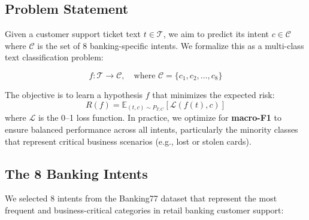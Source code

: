 \documentclass[12pt,a4paper]{article}
\begin{document}
\subsection{Problem Statement}
\label{subsec:problem}

Given a customer support ticket text $t \in \mathcal{T}$, we aim to predict its intent $c \in \mathcal{C}$ where $\mathcal{C}$ is the set of 8 banking-specific intents. We formalize this as a multi-class text classification problem:

\begin{equation}
    f: \mathcal{T} \rightarrow \mathcal{C}, \quad \text{where } \mathcal{C} = \{c_1, c_2, \ldots, c_8\}
\end{equation}

The objective is to learn a hypothesis $f$ that minimizes the expected risk:
\begin{equation}
    R(f) = \mathbb{E}_{(t,c) \sim P_{T,C}} \left[ \mathcal{L}(f(t), c) \right]
\end{equation}
where $\mathcal{L}$ is the 0--1 loss function. In practice, we optimize for \textbf{macro-F1} to ensure balanced performance across all intents, particularly the minority classes that represent critical business scenarios (e.g., lost or stolen cards).

\subsection{The 8 Banking Intents}
\label{subsec:intents}

We selected 8 intents from the Banking77 dataset that represent the most frequent and business-critical categories in retail banking customer support:
\end{document}
